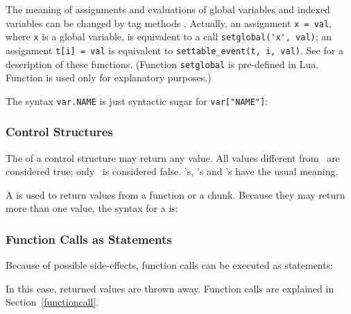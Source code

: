 The meaning of assignments and evaluations of global variables and
indexed variables can be changed by tag methods .
Actually,
an assignment \verb|x = val|, where \verb|x| is a global variable,
is equivalent to a call \verb|setglobal('x', val)|;
an assignment \verb|t[i] = val| is equivalent to
\verb|settable_event(t, i, val)|.
See  for a description of these functions.
(Function \verb|setglobal| is pre-defined in Lua.
Function  is used only for explanatory purposes.)

The syntax \verb|var.NAME| is just syntactic sugar for
\verb|var["NAME"]|:
\begin{Produc}
\end{Produc}%

\subsubsection{Control Structures}
The  of a control structure may return any value.
All values different from \nil\ are considered true;
only \nil\ is considered false.
's, 's and 's have the usual meaning.

\begin{Produc}
\end{Produc}

A  is used to return values from a function or a chunk.
\label{return}
Because they may return more than one value,
the syntax for a  is:
\begin{Produc}
\end{Produc}

\subsubsection{Function Calls as Statements} \label{funcstat}
Because of possible side-effects,
function calls can be executed as statements:
\begin{Produc}
\end{Produc}%
In this case, returned values are thrown away.
Function calls are explained in Section~\ref{functioncall}.


